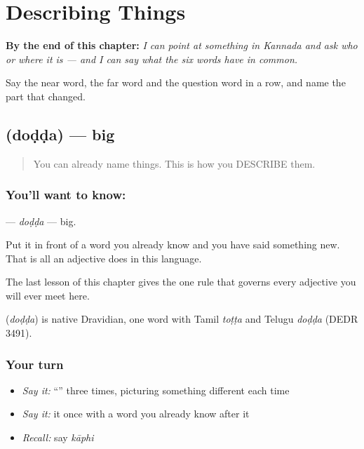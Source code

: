 
\chapter{Describing Things}
\label{ch:kn-describing-things}

\begin{chapteropening}
\textbf{By the end of this chapter:} \emph{I can point at something in Kannada and ask who or where it is — and I can say what the six words have in common.}

Say the near word, the far word and the question word in a row, and name the part that changed.
\end{chapteropening}

\section[\texorpdfstring{\kn{ದೊಡ್ಡ} (doḍḍa)}{ದೊಡ್ಡ (doḍḍa)}]{ (doḍḍa) — big}

\label{lesson:KA-C42-big}



\begin{quote}
You can already name things. This is how you DESCRIBE them.
\end{quote}

\subsection*{You'll want to know: }
\textbf{} — \emph{doḍḍa} — big.

Put it in front of a word you already know and you have said something new. That is all an adjective does in this language.

The last lesson of this chapter gives the one rule that governs every adjective you will ever meet here.

\begin{cousinweb}
\textbf{} (\emph{doḍḍa}) is native Dravidian, one word with Tamil \emph{toṭṭa} and Telugu \emph{doḍḍa} (DEDR 3491).
\end{cousinweb}

\subsection*{Your turn}
\begin{itemize}
\raggedright
  \item \emph{Say it:} \textquotedblleft{}\textquotedblright{} three times, picturing something different each time
  \item \emph{Say it:} it once with a word you already know after it
  \item \emph{Recall:} say \emph{kāphi}
\end{itemize}

